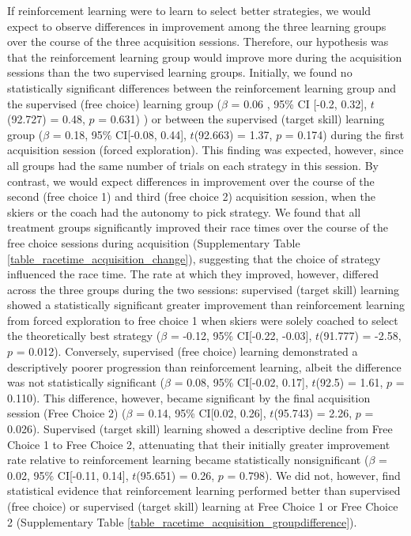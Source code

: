 \documentclass[pdflatex,sn-mathphys-num]{sn-jnl}%
\theoremstyle{thmstyleone}%
\theoremstyle{thmstyletwo}%
\theoremstyle{thmstylethree}%
\begin{document}
If reinforcement learning were to learn to select better strategies, we would expect to observe differences in improvement among the three learning groups over the course of the three acquisition sessions. Therefore, our hypothesis was that the reinforcement learning group would improve more during the acquisition sessions than the two supervised learning groups. Initially, we found no statistically significant differences between the reinforcement learning group and the supervised (free choice) learning group ($\beta$ = 0.06 , 95\% CI [-0.2, 0.32], $t$(92.727) = 0.48, $p$ = 0.631) ) or between the supervised (target skill) learning group ($\beta$ = 0.18, 95\% CI[-0.08, 0.44], $t$(92.663) = 1.37, $p$ = 0.174) during the first acquisition session (forced exploration). This finding was expected, however, since all groups had the same number of trials on each strategy in this session. By contrast, we would expect differences in improvement over the course of the second (free choice 1) and third (free choice 2) acquisition session, when the skiers or the coach had the autonomy to pick strategy. We found that all treatment groups significantly improved their race times over the course of the free choice sessions during acquisition (Supplementary Table \ref{table_racetime_acquisition_change}), suggesting that the choice of strategy influenced the race time. The rate at which they improved, however, differed across the three groups during the two sessions: supervised (target skill) learning showed a statistically significant greater improvement than reinforcement learning from forced exploration to free choice 1 when skiers were solely coached to select the theoretically best strategy ($\beta$ = -0.12, 95\% CI[-0.22, -0.03], $t$(91.777) = -2.58, $p$ = 0.012). Conversely, supervised (free choice) learning demonstrated a descriptively poorer progression than reinforcement learning, albeit the difference was not statistically significant ($\beta$ = 0.08, 95\% CI[-0.02, 0.17], $t$(92.5) = 1.61, $p$ = 0.110). This difference, however, became significant by the final acquisition session (Free Choice 2) ($\beta$ = 0.14, 95\% CI[0.02, 0.26], $t$(95.743) = 2.26, $p$ = 0.026). Supervised (target skill) learning showed a descriptive decline from Free Choice 1 to Free Choice 2, attenuating that their initially greater improvement rate relative to reinforcement learning became statistically nonsignificant  ($\beta$ = 0.02, 95\% CI[-0.11, 0.14], $t$(95.651) = 0.26, $p$ = 0.798). We did not, however, find statistical evidence that reinforcement learning performed better than supervised (free choice) or supervised (target skill) learning at Free Choice 1 or Free Choice 2 (Supplementary Table \ref{table_racetime_acquisition_groupdifference}). 
\end{document}
